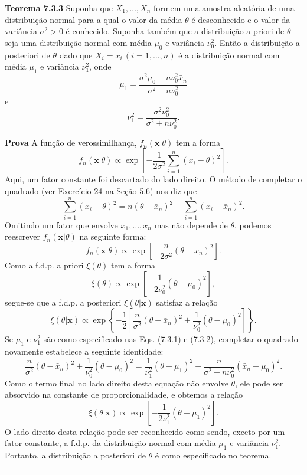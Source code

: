 \vspace{1cm}
\noindent\textbf{Teorema 7.3.3} \quad Suponha que $X_1, \dots, X_n$ formem uma amostra aleatória de uma distribuição normal para a qual o valor da média $\theta$ é desconhecido e o valor da variância $\sigma^2 > 0$ é conhecido. Suponha também que a distribuição a priori de $\theta$ seja uma distribuição normal com média $\mu_0$ e variância $\nu_0^2$. Então a distribuição a posteriori de $\theta$ dado que $X_i=x_i \, (i=1, \dots, n)$ é a distribuição normal com média $\mu_1$ e variância $\nu_1^2$, onde
\begin{equation}
\mu_1 = \frac{\sigma^2\mu_0+n\nu_0^2\bar{x}_n}{\sigma^2+n\nu_0^2} \tag{7.3.1}
\end{equation}
e
\begin{equation}
\nu_1^2 = \frac{\sigma^2\nu_0^2}{\sigma^2+n\nu_0^2}. \tag{7.3.2}
\end{equation}

\noindent\textbf{Prova} \quad A função de verossimilhança, $f_n(\mathbf{x}|\theta)$ tem a forma
$$ f_n(\mathbf{x}|\theta) \propto \exp\left[-\frac{1}{2\sigma^2}\sum_{i=1}^{n}(x_i-\theta)^2\right]. $$
Aqui, um fator constante foi descartado do lado direito. O método de completar o quadrado (ver Exercício 24 na Seção 5.6) nos diz que
$$ \sum_{i=1}^{n}(x_i-\theta)^2 = n(\theta-\bar{x}_n)^2 + \sum_{i=1}^{n}(x_i-\bar{x}_n)^2. $$
Omitindo um fator que envolve $x_1, \dots, x_n$ mas não depende de $\theta$, podemos reescrever $f_n(\mathbf{x}|\theta)$ na seguinte forma:
$$ f_n(\mathbf{x}|\theta) \propto \exp\left[-\frac{n}{2\sigma^2}(\theta-\bar{x}_n)^2\right]. $$
Como a f.d.p. a priori $\xi(\theta)$ tem a forma
$$ \xi(\theta) \propto \exp\left[-\frac{1}{2\nu_0^2}(\theta-\mu_0)^2\right], $$
segue-se que a f.d.p. a posteriori $\xi(\theta|\mathbf{x})$ satisfaz a relação
$$ \xi(\theta|\mathbf{x}) \propto \exp\left\{-\frac{1}{2}\left[\frac{n}{\sigma^2}(\theta-\bar{x}_n)^2+\frac{1}{\nu_0^2}(\theta-\mu_0)^2\right]\right\}. $$
Se $\mu_1$ e $\nu_1^2$ são como especificado nas Eqs. (7.3.1) e (7.3.2), completar o quadrado novamente estabelece a seguinte identidade:
$$ \frac{n}{\sigma^2}(\theta-\bar{x}_n)^2+\frac{1}{\nu_0^2}(\theta-\mu_0)^2 = \frac{1}{\nu_1^2}(\theta-\mu_1)^2 + \frac{n}{\sigma^2+n\nu_0^2}(\bar{x}_n-\mu_0)^2. $$
Como o termo final no lado direito desta equação não envolve $\theta$, ele pode ser absorvido na constante de proporcionalidade, e obtemos a relação
$$ \xi(\theta|\mathbf{x}) \propto \exp\left[-\frac{1}{2\nu_1^2}(\theta-\mu_1)^2\right]. $$
O lado direito desta relação pode ser reconhecido como sendo, exceto por um fator constante, a f.d.p. da distribuição normal com média $\mu_1$ e variância $\nu_1^2$. Portanto, a distribuição a posteriori de $\theta$ é como especificado no teorema. \rule{0.5em}{0.5em}


